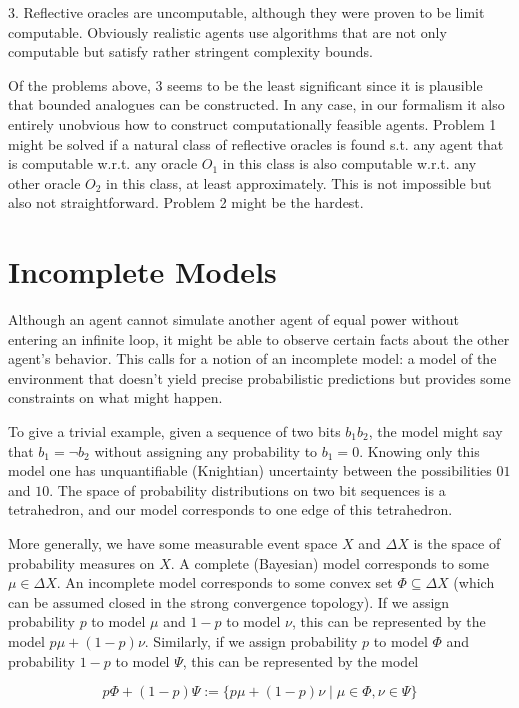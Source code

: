 \documentclass[a4paper]{article}
\newcommand{\SP}[1]{\Delta #1}
\begin{document}
3. Reflective oracles are uncomputable, although they were proven to be limit computable. Obviously realistic agents use algorithms that are not only computable but satisfy rather stringent complexity bounds.

Of the problems above, 3 seems to be the least significant since it is plausible that bounded analogues can be constructed. In any case, in our formalism it also entirely unobvious how to construct computationally feasible agents. Problem 1 might be solved if a natural class of reflective oracles is found s.t. any agent that is computable w.r.t. any oracle ${O_1}$ in this class is also computable w.r.t. any other oracle ${O_2}$ in this class, at least approximately. This is not impossible but also not straightforward. Problem 2 might be the hardest.

\section{Incomplete Models}

Although an agent cannot simulate another agent of equal power without entering an infinite loop, it might be able to observe certain facts about the other agent's behavior. This calls for a notion of an incomplete model: a model of the environment that doesn't yield precise probabilistic predictions but provides some constraints on what might happen. 

To give a trivial example, given a sequence of two bits $b_1b_2$, the model might say that $b_1=\lnot b_2$ without assigning any probability to $b_1=0$. Knowing only this model one has unquantifiable (Knightian) uncertainty between the possibilities $01$ and $10$. The space of probability distributions on two bit sequences is a tetrahedron, and our model corresponds to one edge of this tetrahedron.

More generally, we have some measurable event space ${X}$ and ${\SP{X}}$ is the space of probability measures on ${X}$. A complete (Bayesian) model corresponds to some ${\mu \in \SP{X}}$. An incomplete model corresponds to some convex set ${\Phi \subseteq \SP{X}}$ (which can be assumed closed in the strong convergence topology). If we assign probability ${p}$ to model ${\mu}$ and ${1-p}$ to model ${\nu}$, this can be represented by the model ${p \mu + (1-p) \nu}$. Similarly, if we assign probability ${p}$ to model ${\Phi}$ and probability ${1-p}$ to model ${\Psi}$, this can be represented by the model 

$${p\Phi+(1-p)\Psi:=\{p \mu + (1-p) \nu \mid \mu \in \Phi, \nu \in \Psi\}}$$
\end{document}

